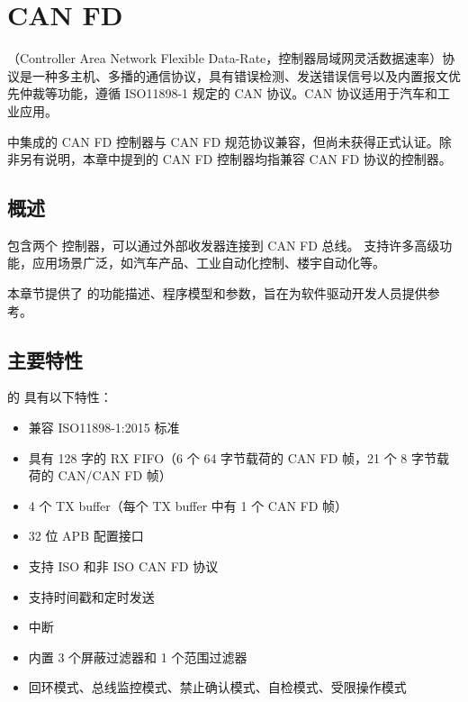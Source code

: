 \documentclass[main\_\_CN.tex]{subfiles}
\begin{document}

\ifglobal
\else
    \listoftodos
    {\let\clearpage\relax \listofdonetodos}
    \tableofcontents
\fi


\hypertarget{canfd}{}
\chapter{CAN FD}
\label{mod:twai}


\modulename{}（Controller Area Network Flexible Data-Rate，控制器局域网灵活数据速率）协议是一种多主机、多播的通信协议，具有错误检测、发送错误信号以及内置报文优先仲裁等功能，遵循 ISO11898-1 规定的 CAN 协议。CAN 协议适用于汽车和工业应用。

\chipname{} 中集成的 CAN FD 控制器与 CAN FD 规范协议兼容，但尚未获得正式认证。除非另有说明，本章中提到的 CAN FD 控制器均指兼容 CAN FD 协议的控制器。



\section{概述}


\chipname{} 包含两个 \modulename{} 控制器，可以通过外部收发器连接到 CAN FD 总线。\modulename{} 支持许多高级功能，应用场景广泛，如汽车产品、工业自动化控制、楼宇自动化等。

本章节提供了 \modulename{} 的功能描述、程序模型和参数，旨在为软件驱动开发人员提供参考。



\section{主要特性}
\label{sec:twai-features}

\chipname{} 的 \modulename{} 具有以下特性：

\begin{itemize}
    \item 兼容 ISO11898-1:2015 标准
    \item 具有 128 字的 RX FIFO（6 个 64 字节载荷的 CAN FD 帧，21 个 8 字节载荷的 CAN/CAN FD 帧）
    \item 4 个 TX buffer（每个 TX buffer 中有 1 个 CAN FD 帧）
    \item 32 位 APB 配置接口
    \item 支持 ISO 和非 ISO CAN FD 协议
    \item 支持时间戳和定时发送
    \item 中断
    \item 内置 3 个屏蔽过滤器和 1 个范围过滤器
    \item 回环模式、总线监控模式、禁止确认模式、自检模式、受限操作模式
\end{itemize}
\end{document}
